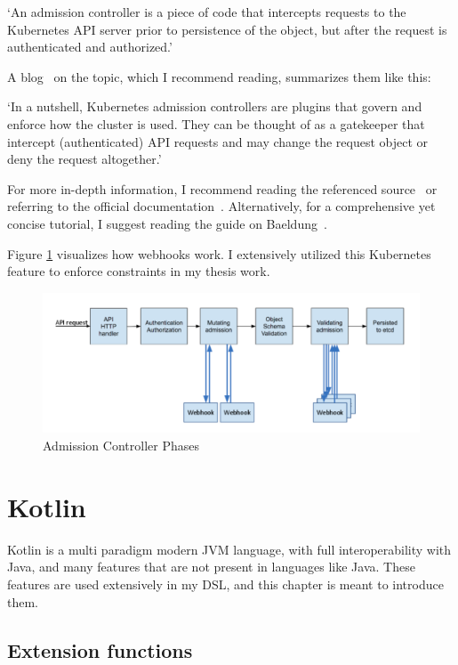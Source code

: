 `An admission controller is a piece of code that intercepts requests to the Kubernetes API server prior to persistence of the object, but after the request is authenticated and authorized.'

A blog~\cite{K8sAdmissionBlog} on the topic, which I recommend reading, summarizes them like this:

`In a nutshell, Kubernetes admission controllers are plugins that govern and enforce how the cluster is used. They can be thought of as a gatekeeper that intercept (authenticated) API requests and may change the request object or deny the request altogether.' 

For more in-depth information, I recommend reading the referenced source~\cite{K8sAdmissionBlog} or referring to the official documentation~\cite{K8sAdmissionOfficial}. Alternatively, for a comprehensive yet concise tutorial, I suggest reading the guide on Baeldung~\cite{K8sBaeldung}.

Figure \ref{fig:dynadm} visualizes how webhooks work. I extensively utilized this Kubernetes feature to enforce constraints in my thesis work.

\begin{figure}[h]
    \centering
    \includegraphics[width=130mm, keepaspectratio]{content/10_prerequisites/dynadm.png}
    \caption{Admission Controller Phases~\cite{K8sAdmissionBlog}}
    \label{fig:dynadm}
\end{figure}

\section{Kotlin}

Kotlin is a multi paradigm modern JVM language, with full interoperability with Java, and many features that are not present in languages like Java. These features are used extensively in my DSL, and this chapter is meant to introduce them.

\subsection{Extension functions}
\label{sec:extension}

